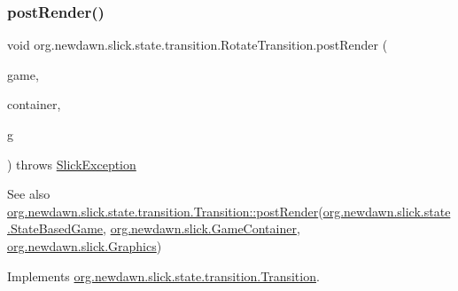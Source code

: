 \subsubsection{\texorpdfstring{post\+Render()}{postRender()}}
{\footnotesize\ttfamily void org.\+newdawn.\+slick.\+state.\+transition.\+Rotate\+Transition.\+post\+Render (\begin{DoxyParamCaption}\item[{\mbox{\hyperlink{classorg_1_1newdawn_1_1slick_1_1state_1_1_state_based_game}{State\+Based\+Game}}}]{game,  }\item[{\mbox{\hyperlink{classorg_1_1newdawn_1_1slick_1_1_game_container}{Game\+Container}}}]{container,  }\item[{\mbox{\hyperlink{classorg_1_1newdawn_1_1slick_1_1_graphics}{Graphics}}}]{g }\end{DoxyParamCaption}) throws \mbox{\hyperlink{classorg_1_1newdawn_1_1slick_1_1_slick_exception}{Slick\+Exception}}\hspace{0.3cm}{\ttfamily [inline]}}

\begin{DoxySeeAlso}{See also}
\mbox{\hyperlink{interfaceorg_1_1newdawn_1_1slick_1_1state_1_1transition_1_1_transition_ac113f4d5a19962a62a8adec7f9ab5d47}{org.\+newdawn.\+slick.\+state.\+transition.\+Transition\+::post\+Render}}(\mbox{\hyperlink{classorg_1_1newdawn_1_1slick_1_1state_1_1_state_based_game}{org.\+newdawn.\+slick.\+state.\+State\+Based\+Game}}, \mbox{\hyperlink{classorg_1_1newdawn_1_1slick_1_1_game_container}{org.\+newdawn.\+slick.\+Game\+Container}}, \mbox{\hyperlink{classorg_1_1newdawn_1_1slick_1_1_graphics}{org.\+newdawn.\+slick.\+Graphics}}) 
\end{DoxySeeAlso}


Implements \mbox{\hyperlink{interfaceorg_1_1newdawn_1_1slick_1_1state_1_1transition_1_1_transition_ac113f4d5a19962a62a8adec7f9ab5d47}{org.\+newdawn.\+slick.\+state.\+transition.\+Transition}}.


